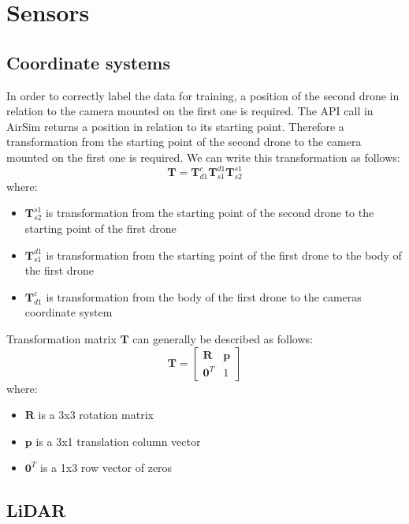 \documentclass[twoside]{ctuthesis}
\theoremstyle{plain}
\theoremstyle{definition}
\theoremstyle{note}
\begin{document}
\chapter{Sensors}
\section{Coordinate systems}
In order to correctly label the data for training, a position of the second drone in relation to the camera mounted on the first one is required. The API call in AirSim returns a position in relation to its starting point. Therefore a transformation from the starting point of the second drone to the camera mounted on the first one is required. We can write this transformation as follows:
\begin{equation}
	\textbf{T}=\textbf{T}_{d1}^{c}\textbf{T}_{s1}^{d1}\textbf{T}_{s2}^{s1}
\end{equation}
where:
\begin{itemize}
	\item $\textbf{T}_{s2}^{s1}$ is transformation from the starting point of the second drone to the starting point of the first drone
	\item $\textbf{T}_{s1}^{d1}$ is transformation from the starting point of the first drone to the body of the first drone
	\item $\textbf{T}_{d1}^{c}$ is transformation from the body of the first drone to the cameras coordinate system
\end{itemize}
Transformation matrix $\textbf{T}$ can generally be described as follows:
\begin{equation}
	\textbf{T}=\begin{bmatrix}
		\textbf{R} & \textbf{p}\\
		\textbf{0}^T & 1
	\end{bmatrix}
\end{equation}
where:
\begin{itemize}
	\item $\textbf{R}$ is a 3x3 rotation matrix
	\item $\textbf{p}$ is a 3x1 translation column vector
	\item $\textbf{0}^T$ is a 1x3 row vector of zeros
\end{itemize}
\section{LiDAR}
\end{document}
